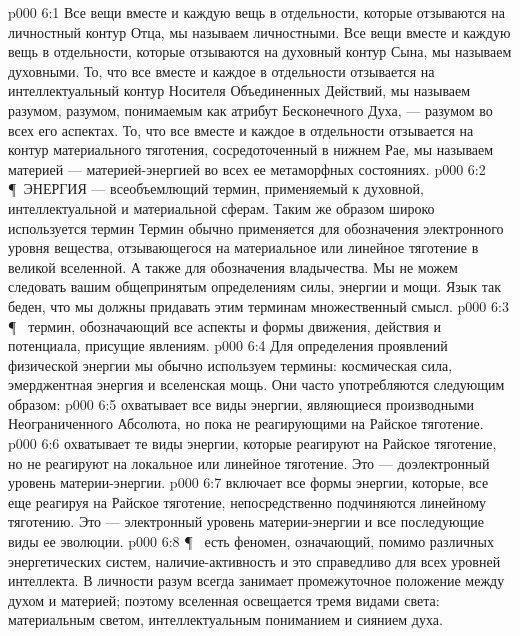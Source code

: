 \vs p000 6:1 Все вещи вместе и каждую вещь в отдельности, которые отзываются на личностный контур Отца, мы называем личностными. Все вещи вместе и каждую вещь в отдельности, которые отзываются на духовный контур Сына, мы называем духовными. То, что все вместе и каждое в отдельности отзывается на интеллектуальный контур Носителя Объединенных Действий, мы называем разумом, разумом, понимаемым как атрибут Бесконечного Духа, --- разумом во всех его аспектах. То, что все вместе и каждое в отдельности отзывается на контур материального тяготения, сосредоточенный в нижнем Рае, мы называем материей --- материей\hyp{}энергией во всех ее метаморфных состояниях.
\vs p000 6:2 \P\ ЭНЕРГИЯ --- всеобъемлющий термин, применяемый к духовной, интеллектуальной и материальной сферам. Таким же образом широко используется термин  Термин  обычно применяется для обозначения электронного уровня вещества, отзывающегося на материальное или линейное тяготение в великой вселенной. А также для обозначения владычества. Мы не можем следовать вашим общепринятым определениям силы, энергии и мощи. Язык так беден, что мы должны придавать этим терминам множественный смысл.
\vs p000 6:3 \P\  термин, обозначающий все аспекты и формы движения, действия и потенциала, присущие явлениям.
\vs p000 6:4 Для определения проявлений физической энергии мы обычно используем термины: космическая сила, эмерджентная энергия и вселенская мощь. Они часто употребляются следующим образом:
\vs p000 6:5 \bibnobreakspace {} охватывает все виды энергии, являющиеся производными Неограниченного Абсолюта, но пока не реагирующими на Райское тяготение.
\vs p000 6:6 \bibnobreakspace {} охватывает те виды энергии, которые реагируют на Райское тяготение, но не реагируют на локальное или линейное тяготение. Это --- доэлектронный уровень материи\hyp{}энергии.
\vs p000 6:7 \bibnobreakspace {} включает все формы энергии, которые, все еще реагируя на Райское тяготение, непосредственно подчиняются линейному тяготению. Это --- электронный уровень материи\hyp{}энергии и все последующие виды ее эволюции.
\vs p000 6:8 \P\  есть феномен, означающий, помимо различных энергетических систем, наличие\hyp{}активность  и это справедливо для всех уровней интеллекта. В личности разум всегда занимает промежуточное положение между духом и материей; поэтому вселенная освещается тремя видами света: материальным светом, интеллектуальным пониманием и сиянием духа.
